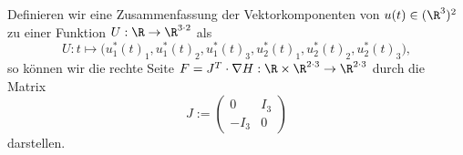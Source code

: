 \documentclass{subfiles}
\begin{document}
    Definieren wir eine Zusammenfassung der Vektorkomponenten von $u(t)\in(\R^3)^2$ zu einer Funktion $U:\R\to\R^{3\cdot 2}$ als
    \[
        U:t\mapsto \bigl(u_1^*(t)_1,u_1^*(t)_2,u_1^*(t)_3,u_2^*(t)_1,u_2^*(t)_2,u_2^*(t)_3\bigr),
    \]
    so können wir die rechte Seite $F=J^T\cdot\nabla H:\R\times\R^{2\cdot 3}\to\R^{2\cdot 3}$ durch die Matrix
        \[
        J:=\begin{pmatrix}
            0 & I_{3} \\
            -I_{3} & 0
        \end{pmatrix}
    \]
    darstellen.
\end{document}
